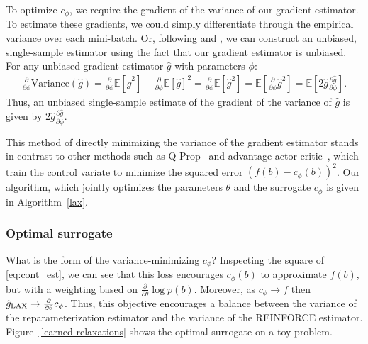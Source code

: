 \documentclass{article}
\newcommand{\E}{\mathbb{E}}
\newcommand{\PT}{\frac{\partial}{\partial \theta}}
\newcommand{\PPH}{\frac{\partial}{\partial \phi}}
\newcommand{\LAX}{{\textnormal{LAX}}}
\begin{document}
To optimize $c_\phi$, we require the gradient of the variance of our gradient estimator.
To estimate these gradients, we could simply differentiate through the empirical variance over each mini-batch.
Or, following \cite{ruiz2016overdispersed} and \cite{tucker2017rebar}, we can construct an unbiased, single-sample estimator using the fact that our gradient estimator is unbiased.
For any unbiased gradient estimator $\hat g$ with parameters $\phi$:
%
\begin{align}
\PPH \text{Variance}(\hat g)
= \PPH \E[\hat g^2] - \PPH \E[\hat g]^2
= \PPH \E[\hat g^2]
= \E \left[ \PPH \hat g^2 \right]
= \E \left[ 2 \hat g \frac{\partial \hat g}{\partial \phi} \right].
\label{eq:vargrad}
\end{align}  %
%
Thus, an unbiased single-sample estimate of the gradient of the variance of $\hat g$ is given by {$2 \hat g \frac{\partial \hat g}{\partial \phi}$}.

This method of directly minimizing the variance of the gradient estimator stands in contrast to other methods such as Q-Prop~\citep{gu2016q} and advantage actor-critic~\citep{sutton2000policy}, which train the control variate to minimize the squared error $(f(b) - c_\phi(b))^2$.
Our algorithm, which jointly optimizes the parameters $\theta$ and the surrogate $c_\phi$ is given in Algorithm~\ref{lax}.

\subsubsection{Optimal surrogate}
What is the form of the variance-minimizing $c_\phi$?
Inspecting the square of \eqref{eq:cont_est}, we can see that this loss encourages $c_\phi(b)$ to approximate $f(b)$, but with a weighting based on $\PT\log p(b)$.  %
Moreover, as $c_\phi \rightarrow f$ then $\hat g_\textnormal{\LAX} \rightarrow \PT c_\phi$.
Thus, this objective encourages a balance between the variance of the reparameterization estimator and the variance of the REINFORCE estimator.
Figure~\ref{learned-relaxations} shows the optimal surrogate on a toy problem.
\end{document}
